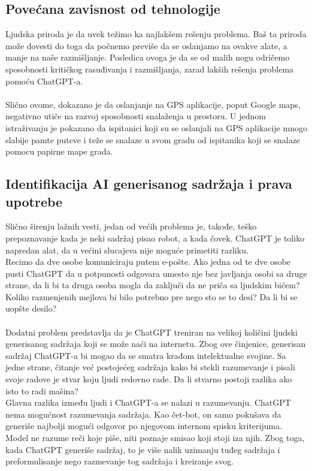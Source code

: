\documentclass[fleqn, 12pt]{article}
\begin{document}
    \subsection{Povećana zavisnost od tehnologije}
        \begin{text}
            Ljudska priroda je da uvek težimo ka najlakšem rešenju problema. Baš ta priroda može dovesti do toga da počnemo previše da se oslanjamo na ovakve alate, a manje na naše razmišljanje. Posledica ovoga je da se od malih nogu odričemo sposobnosti kritičkog rasuđivanja i razmišljanja, zarad lakših rešenja problema pomoću ChatGPT-a.
            \\\\
            Slično ovome, dokazano je da oslanjanje na GPS aplikacije, poput Google maps, negativno utiče na razvoj sposobnosti snalaženja u prostoru. U jednom istraživanju je pokazano da ispitanici koji su se oslanjali na GPS aplikacije mnogo slabije pamte puteve i teže se snalaze u svom gradu od ispitanika koji se snalaze pomocu papirne mape grada\cite{G5}.
            
        \end{text}
\newpage
    \subsection{Identifikacija AI generisanog sadržaja i prava upotrebe}
        \begin{text}
            Slično širenju lažnih vesti, jedan od većih problema je, takođe, teško prepoznavanje kada je neki sadržaj pisao robot, a kada čovek. ChatGPT je toliko napredan alat, da u većini slucajeva nije moguće primetiti razliku.
            \\
            Recimo da dve osobe komuniciraju putem e-pošte. Ako jedna od te dve osobe pusti ChatGPT da u potpunosti odgovara umesto nje bez javljanja osobi sa druge strane, da li bi ta druga osoba mogla da zaključi da ne priča sa ljudskim bićem? Koliko razmenjenih mejlova bi bilo potrebno pre nego sto se to desi? Da li bi se uopšte desilo?
            \\\\
            Dodatni problem predstavlja da je ChatGPT treniran na velikoj količini ljudski generisanog sadržaja koji se može naći na internetu. Zbog ove činjenice, generisan sadržaj ChatGPT-a bi mogao da se smatra krađom intelektualne svojine. Sa jedne strane, čitanje već postojećeg sadržaja kako bi stekli razumevanje i pisali svoje radove je stvar koju ljudi redovno rade. Da li stvarno postoji razlika ako isto to radi mašina?
            \\
            Glavna razlika između ljudi i ChatGPT-a se nalazi u razumevanju. ChatGPT nema mogućnost razumevanja sadržaja. Kao čet-bot, on samo pokušava da generiše najbolji mogući odgovor po njegovom internom spisku kriterijuma. Model ne razume reči koje piše, niti poznaje smisao koji stoji iza njih. Zbog toga, kada ChatGPT generiše sadržaj, to je više nalik uzimanju tuđeg sadržaja i preformulisanje nego razmevanje tog sadržaja i kreiranje svog.
        \end{text}
\end{document}
